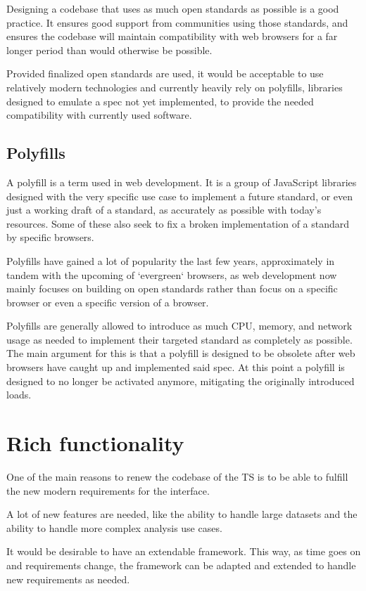 Designing a codebase that uses as much open standards as possible is a good
practice. It ensures good support from communities using those standards, and
ensures the codebase will maintain compatibility with web browsers for a far
longer period than would otherwise be possible.

Provided finalized open standards are used, it would be acceptable to use
relatively modern technologies and currently heavily rely on polyfills, libraries
designed to emulate a spec not yet implemented, to provide the needed
compatibility with currently used software.

\subsection{Polyfills}
A polyfill is a term used in web development. It is a group of JavaScript
libraries designed with the very specific use case to implement a future
standard, or even just a working draft of a standard, as accurately as possible
with today's resources. Some of these also seek to fix a broken implementation
of a standard by specific browsers.

Polyfills have gained a lot of popularity the last few years, approximately in
tandem with the upcoming of `evergreen` browsers, as web development now mainly
focuses on building on open standards rather than focus on a specific browser
or even a specific version of a browser.

Polyfills are generally allowed to introduce as much CPU, memory, and network
usage as needed to implement their targeted standard as completely as possible.
The main argument for this is that a polyfill is designed to be obsolete after
web browsers have caught up and implemented said spec. At this point a polyfill
is designed to no longer be activated anymore, mitigating the originally
introduced loads.

\section{Rich functionality}
One of the main reasons to renew the codebase of the TS is to be able to fulfill
the new modern requirements for the interface.

A lot of new features are needed, like the ability to handle large datasets and
the ability to handle more complex analysis use cases.

It would be desirable to have an extendable framework. This way, as time goes on
and requirements change, the framework can be adapted and extended to handle
new requirements as needed.

